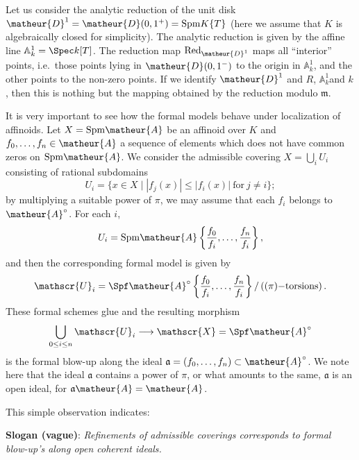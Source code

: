 \begin{appexa}
Let us consider the analytic reduction of the unit disk 
$\matheur{D}^1=\matheur{D}(0,1^{+})=\mathrm{Spm}K\{T\}$
(here we assume that $K$ is algebraically closed for simplicity).
The analytic reduction is given by the affine line 
$\mathbb{A}^1_k=\Spec k[T]$.
The reduction map $\mathrm{Red}_{\matheur{D}^1}$ maps all ``interior''
points, i.e.\ those points lying in $\matheur{D}(0,1^{-})$ to the origin
in $\mathbb{A}^1_k$, and the other points to the non-zero points.
If we identify $\matheur{D}^1$ and $R$, $\mathbb{A}^1_k$and $k$, then
this is nothing but the mapping obtained by the reduction modulo
$\mathfrak{m}$.
\end{appexa}

It is very important to see how the formal models behave under 
localization of affinoids.
Let $X=\mathrm{Spm}\matheur{A}$ be an affinoid over $K$ and $f_0,\ldots,f_n\in
\matheur{A}$ a sequence of elements which does not have common zeros
on $\mathrm{Spm}\matheur{A}$.
We consider the admissible covering $X=\bigcup_iU_i$ consisting of 
rational subdomains
$$
U_i=\{x\in X \mid |f_j(x)|\leq|f_i(x)|\ \mathrm{for}\ j\neq i\};
$$
by multiplying a suitable power of $\pi$, we may assume that each
$f_i$ belongs to $\matheur{A}^{\circ}$.
For each $i$, 
\begin{equation*}
 U_i=\mathrm{Spm}\matheur{A}\left\{\frac{f_0}{f_i},\ldots,
			     \frac{f_n}{f_i}\right\},
\end{equation*}
and then the corresponding formal model is given by 
\begin{equation*}
 \mathscr{U}_i=\Spf\matheur{A}^{\circ}
 \left\{\frac{f_0}{f_i},\ldots,\frac{f_n}{f_i}\right\}/
 \left((\pi)\mathrm{-torsions}\right).
\end{equation*}
These formal schemes glue and the resulting morphism 
\begin{equation*}
 \bigcup_{0\leq i\leq n}\mathscr{U}_i\longrightarrow\mathscr{X}
  =\Spf\matheur{A}^{\circ}
\end{equation*}
is the formal blow-up along the ideal 
$\mathfrak{a}=(f_0,\ldots,f_n)\subset\matheur{A}^{\circ}$.
We note here that the ideal $\mathfrak{a}$ contains a power of $\pi$, or
what amounts to the same, $\mathfrak{a}$ is an open ideal, for 
$\mathfrak{a}\matheur{A}=\matheur{A}$.

This simple observation indicates:

\vspace{1ex}\noindent
{\bf Slogan (vague)}: {\it Refinements of admissible coverings corresponds
to formal blow-up's along open coherent ideals.}

